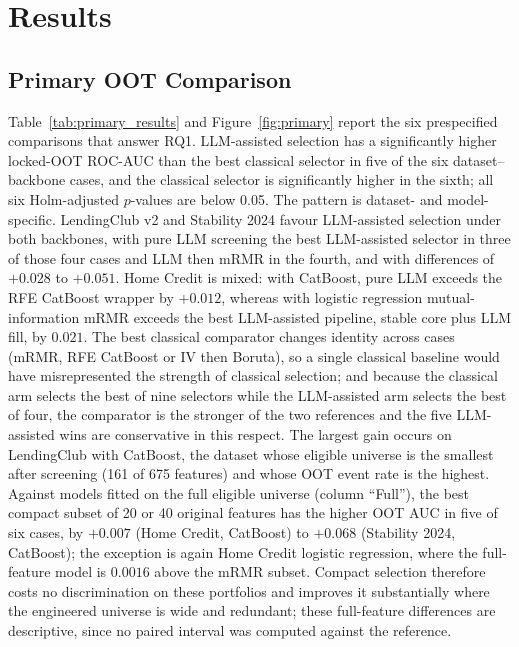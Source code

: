 \documentclass[final,5p,twocolumn]{elsarticle}
\begin{document}

\section{Results}
\label{sec:results}

\subsection{Primary OOT Comparison}
\label{subsec:primary_results}

Table~\ref{tab:primary_results} and Figure~\ref{fig:primary} report the six prespecified comparisons that answer RQ1. LLM-assisted selection has a significantly higher locked-OOT ROC-AUC than the best classical selector in five of the six dataset--backbone cases, and the classical selector is significantly higher in the sixth; all six Holm-adjusted $p$-values are below 0.05. The pattern is dataset- and model-specific. LendingClub v2 and Stability 2024 favour LLM-assisted selection under both backbones, with pure LLM screening the best LLM-assisted selector in three of those four cases and LLM then mRMR in the fourth, and with differences of $+0.028$ to $+0.051$. Home Credit is mixed: with CatBoost, pure LLM exceeds the RFE CatBoost wrapper by $+0.012$, whereas with logistic regression mutual-information mRMR exceeds the best LLM-assisted pipeline, stable core plus LLM fill, by $0.021$. The best classical comparator changes identity across cases (mRMR, RFE CatBoost or IV then Boruta), so a single classical baseline would have misrepresented the strength of classical selection; and because the classical arm selects the best of nine selectors while the LLM-assisted arm selects the best of four, the comparator is the stronger of the two references and the five LLM-assisted wins are conservative in this respect. The largest gain occurs on LendingClub with CatBoost, the dataset whose eligible universe is the smallest after screening (161 of 675 features) and whose OOT event rate is the highest. Against models fitted on the full eligible universe (column ``Full''), the best compact subset of 20 or 40 original features has the higher OOT AUC in five of six cases, by $+0.007$ (Home Credit, CatBoost) to $+0.068$ (Stability 2024, CatBoost); the exception is again Home Credit logistic regression, where the full-feature model is $0.0016$ above the mRMR subset. Compact selection therefore costs no discrimination on these portfolios and improves it substantially where the engineered universe is wide and redundant; these full-feature differences are descriptive, since no paired interval was computed against the reference.
\end{document}
